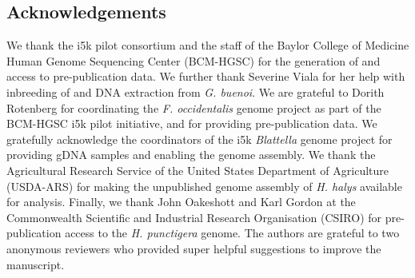 \subsection{Acknowledgements}\label{acknowledgements}

We thank the i5k pilot consortium and the staff of the Baylor College of
Medicine Human Genome Sequencing Center (BCM-HGSC) for the generation of
and access to pre-publication data. We further thank Severine Viala for
her help with inbreeding of and DNA extraction from \emph{G. buenoi}. We
are grateful to Dorith Rotenberg for coordinating the \emph{F.
occidentalis} genome project as part of the BCM-HGSC i5k pilot
initiative, and for providing pre-publication data. We gratefully
acknowledge the coordinators of the i5k \emph{Blattella} genome project
for providing gDNA samples and enabling the genome assembly. We thank
the Agricultural Research Service of the United States Department of
Agriculture (USDA-ARS) for making the unpublished genome assembly of
\emph{H. halys} available for analysis. Finally, we thank John Oakeshott
and Karl Gordon at the Commonwealth Scientific and Industrial Research
Organisation (CSIRO) for pre-publication access to the \emph{H.
punctigera} genome. The authors are grateful to two anonymous reviewers
who provided super helpful suggestions to improve the manuscript.
